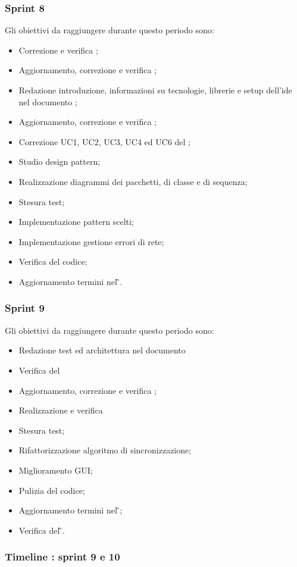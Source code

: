 \subsubsection{Sprint 8}
Gli obiettivi da raggiungere durante questo periodo sono:
\begin{itemize}
	\item Correzione e verifica \NdP{};
	\item Aggiornamento, correzione e verifica \PdP{};
	\item Redazione introduzione, informazioni su tecnologie, librerie e setup dell'ide nel documento \MS{};
	\item Aggiornamento, correzione e verifica \PdQ{};
	\item Correzione UC1, UC2, UC3, UC4 ed UC6 del \AdR{};
	\item Studio design pattern;
	\item Realizzazione diagrammi dei pacchetti, di classe e di sequenza;
	\item Stesura test;
	\item Implementazione pattern scelti;
	\item Implementazione gestione errori di rete;
	\item Verifica del codice;
	\item Aggiornamento termini nel \G{}.
\end{itemize}

\subsubsection{Sprint 9}
Gli obiettivi da raggiungere durante questo periodo sono:
\begin{itemize}
	\item Redazione test ed architettura nel documento \MS{}
	\item Verifica del \MS{}
	\item Aggiornamento, correzione e verifica \PdP{};
	\item Realizzazione e verifica \MU{}
	\item Stesura test;
	\item Rifattorizzazione algoritmo di sincronizzazione;
	\item Miglioramento GUI;
	\item Pulizia del codice;
	\item Aggiornamento termini nel \G{};
	\item Verifica del \G{}.
\end{itemize}
\subsubsection{Timeline : sprint 9 e 10}

